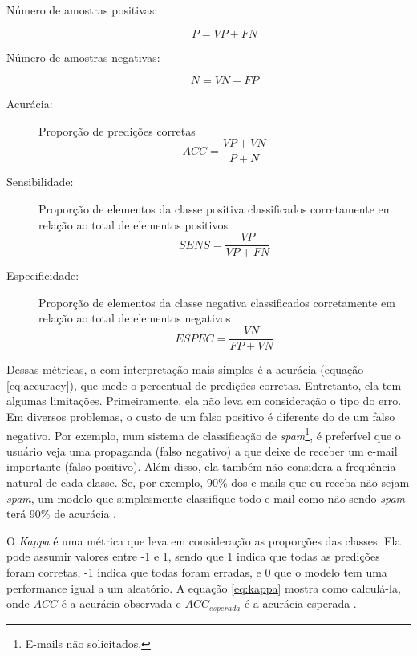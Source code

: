 \documentclass[a4paper,titlepage]{ppgi}\usepackage[]{graphicx}\usepackage[]{color}
\begin{document}
\begin{description}
\item[Número de amostras positivas:]
\begin{equation}
\label{eq:positive-rate}
P = VP + FN
\end{equation}
\item[Número de amostras negativas:]
\begin{equation}
\label{eq:negative-rate}
N = VN + FP
\end{equation}
\item[Acurácia:] Proporção de predições corretas
\begin{equation}
\label{eq:accuracy}
ACC = \frac{VP + VN}{P + N}
\end{equation}
\item[Sensibilidade:] Proporção de elementos da classe positiva classificados
corretamente em relação ao total de elementos positivos
\begin{equation}
\label{eq:sensitivity}
SENS = \frac{VP}{VP + FN}
\end{equation}
\item[Especificidade:] Proporção de elementos da classe negativa classificados
corretamente em relação ao total de elementos negativos
\begin{equation}
\label{eq:specificity}
ESPEC = \frac{VN}{FP + VN}
\end{equation}
\end{description}

Dessas métricas, a com interpretação mais simples é a acurácia (equação
\ref{eq:accuracy}), que mede o percentual de predições corretas. Entretanto,
ela tem algumas limitações. Primeiramente, ela não leva em consideração o tipo
do erro. Em diversos problemas, o custo de um falso positivo é diferente do de
um falso negativo. Por exemplo, num sistema de classificação de
\emph{spam}\footnote{E-mails não solicitados.}, é preferível que o usuário veja
uma propaganda (falso negativo) a que deixe de receber um e-mail importante
(falso positivo). Além disso, ela também não considera a frequência natural de
cada classe. Se, por exemplo, 90\% dos e-mails que eu receba não sejam
\emph{spam}, um modelo que simplesmente classifique todo e-mail como não sendo
\emph{spam} terá 90\% de acurácia \cite{Kuhn2013}.

O \emph{Kappa} é uma métrica que leva em consideração as proporções das
classes. Ela pode assumir valores entre -1 e 1, sendo que 1 indica que todas as
predições foram corretas, -1 indica que todas foram erradas, e 0 que o modelo
tem uma performance igual a um aleatório. A equação \ref{eq:kappa} mostra como
calculá-la, onde $ACC$ é a acurácia observada e $ACC_{esperada}$ é a acurácia
esperada \cite{Cohen1960}.
\end{document}
